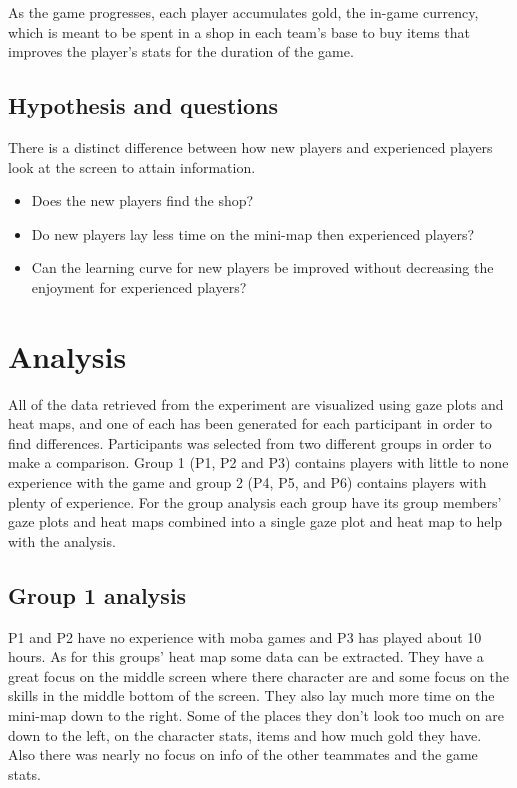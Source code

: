 \documentclass[notitlepage]{report}
\begin{document}
As the game progresses, each player accumulates gold, the in-game currency, which is meant to be spent in a shop in each team's base to buy items that improves the player's stats for the duration of the game.

\section{Hypothesis and questions}
There is a distinct difference between how new players and experienced players look at the screen to attain information.

\begin{itemize}
\item Does the new players find the shop?
\item Do new players lay less time on the mini-map then experienced players?
\item Can the learning curve for new players be improved without decreasing the enjoyment for experienced players?
\end{itemize}

\chapter{Analysis}
All of the data retrieved from the experiment are visualized using gaze plots and heat maps, and one of each has been generated for each participant in order to find differences. Participants was selected from two different groups in order to make a comparison. Group 1 (P1, P2 and P3) contains players with little to none experience with the game and group 2 (P4, P5, and P6) contains players with plenty of experience. For the group analysis each group have its group members' gaze plots and heat maps combined into a single gaze plot and heat map to help with the analysis.

\section{Group 1 analysis}
P1 and P2 have no experience with moba games and P3 has played about 10 hours. As for this groups' heat map some data can be extracted. They have a great focus on the middle screen where there character are and some focus on the skills in the middle bottom of the screen.  They also lay much more time on the mini-map down to the right. Some of the places they don't look too much on are down to the left, on the character stats, items and how much gold they have. Also there was nearly no focus on info of the other teammates and the game stats.
\end{document}
